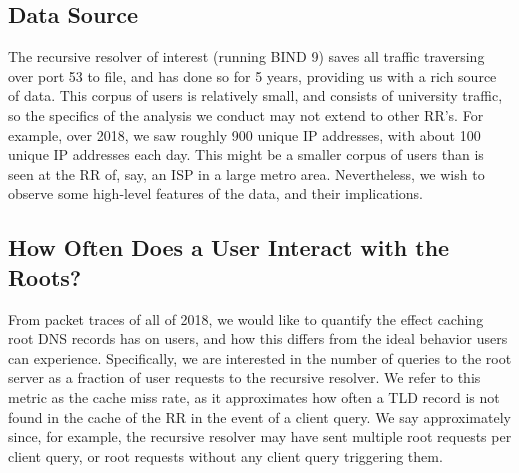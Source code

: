 \documentclass[sigconf,nonacm,10pt]{acmart}
\begin{document}
\subsection{Data Source}\label{data-source}

The recursive resolver of interest (running BIND 9) saves all traffic
traversing over port 53 to file, and has done so for 5 years, providing
us with a rich source of data. This corpus of users is relatively small,
and consists of university traffic, so the specifics of the analysis we
conduct may not extend to other RR's. For example, over 2018, we saw
roughly 900 unique IP addresses, with about 100 unique IP addresses each
day. This might be a smaller corpus of users than is seen at the RR of,
say, an ISP in a large metro area. Nevertheless, we wish to observe some
high-level features of the data, and their implications.

\subsection{How Often Does a User Interact with the
Roots?}\label{how-often-does-a-user-interact-with-the-roots}

From packet traces of all of 2018, we would like to quantify the effect
caching root DNS records has on users, and how this differs from the
ideal behavior users can experience. Specifically, we are interested in
the number of queries to the root server as a fraction of user requests
to the recursive resolver. We refer to this metric as the cache miss
rate, as it approximates how often a TLD record is not found in the
cache of the RR in the event of a client query. We say approximately
since, for example, the recursive resolver may have sent multiple root
requests per client query, or root requests without any client query
triggering them.
\end{document}
